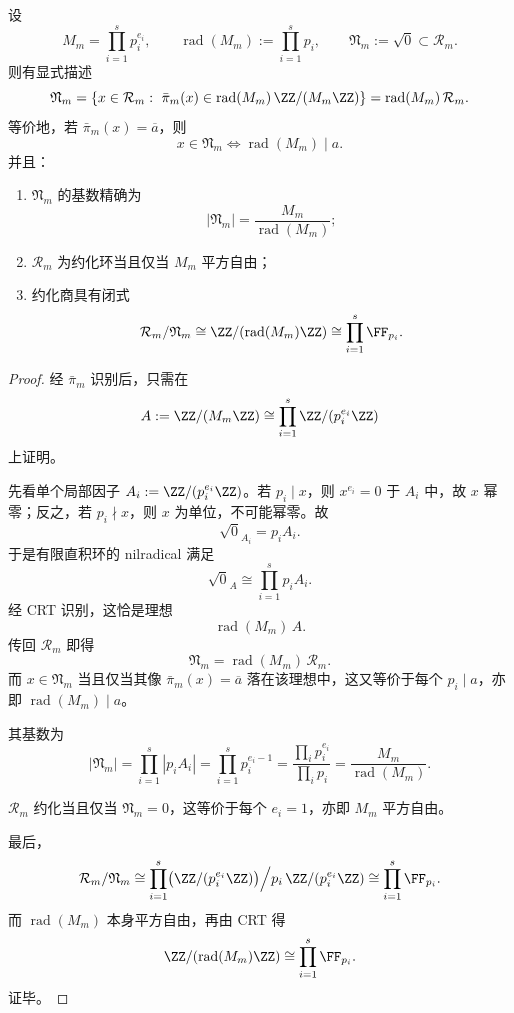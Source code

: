 \begin{theorem}\label{thm:xi-fold-congruence-nilradical-reduced-quotient}
设
\[
M_m=\prod_{i=1}^{s}p_i^{e_i},
\qquad
\operatorname{rad}(M_m):=\prod_{i=1}^{s}p_i,
\qquad
\mathfrak N_m:=\sqrt{0}\subset \mathcal R_m.
\]
则有显式描述
\[
\mathfrak N_m
=
\{x\in \mathcal R_m:\ \bar\pi_m(x)\in \operatorname{rad}(M_m)\,\ZZ/(M_m\ZZ)\}
=
\operatorname{rad}(M_m)\,\mathcal R_m.
\]
等价地，若 \(\bar\pi_m(x)=\overline a\)，则
\[
x\in \mathfrak N_m
\iff
\operatorname{rad}(M_m)\mid a.
\]
并且：
\begin{enumerate}
  \item \(\mathfrak N_m\) 的基数精确为
  \[
  |\mathfrak N_m|=\frac{M_m}{\operatorname{rad}(M_m)};
  \]
  \item \(\mathcal R_m\) 为约化环当且仅当 \(M_m\) 平方自由；
  \item 约化商具有闭式
  \[
  \mathcal R_m/\mathfrak N_m
  \cong
  \ZZ/(\operatorname{rad}(M_m)\ZZ)
  \cong
  \prod_{i=1}^{s}\FF_{p_i}.
  \]
\end{enumerate}
\end{theorem}
\begin{proof}
经 \(\bar\pi_m\) 识别后，只需在
\[
A:=\ZZ/(M_m\ZZ)\cong \prod_{i=1}^{s}\ZZ/(p_i^{e_i}\ZZ)
\]
上证明。

先看单个局部因子 \(A_i:=\ZZ/(p_i^{e_i}\ZZ)\)。若 \(p_i\mid x\)，则 \(x^{e_i}=0\) 于 \(A_i\) 中，故 \(x\) 幂零；反之，若 \(p_i\nmid x\)，则 \(x\) 为单位，不可能幂零。故
\[
\sqrt{0}_{A_i}=p_iA_i.
\]
于是有限直积环的 nilradical 满足
\[
\sqrt{0}_{A}
\cong
\prod_{i=1}^{s}p_iA_i.
\]
经 CRT 识别，这恰是理想
\[
\operatorname{rad}(M_m)\,A.
\]
传回 \(\mathcal R_m\) 即得
\[
\mathfrak N_m=\operatorname{rad}(M_m)\,\mathcal R_m.
\]
而 \(x\in \mathfrak N_m\) 当且仅当其像 \(\bar\pi_m(x)=\overline a\) 落在该理想中，这又等价于每个 \(p_i\mid a\)，亦即 \(\operatorname{rad}(M_m)\mid a\)。

其基数为
\[
|\mathfrak N_m|
=
\prod_{i=1}^{s}|p_iA_i|
=
\prod_{i=1}^{s}p_i^{e_i-1}
=
\frac{\prod_i p_i^{e_i}}{\prod_i p_i}
=
\frac{M_m}{\operatorname{rad}(M_m)}.
\]

\(\mathcal R_m\) 约化当且仅当 \(\mathfrak N_m=0\)，这等价于每个 \(e_i=1\)，亦即 \(M_m\) 平方自由。

最后，
\[
\mathcal R_m/\mathfrak N_m
\cong
\prod_{i=1}^{s}\bigl(\ZZ/(p_i^{e_i}\ZZ)\bigr)\Big/p_i\,\ZZ/(p_i^{e_i}\ZZ)
\cong
\prod_{i=1}^{s}\FF_{p_i}.
\]
而 \(\operatorname{rad}(M_m)\) 本身平方自由，再由 CRT 得
\[
\ZZ/(\operatorname{rad}(M_m)\ZZ)\cong \prod_{i=1}^{s}\FF_{p_i}.
\]
证毕。
\end{proof}

